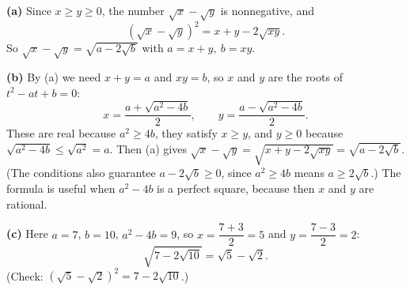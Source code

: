 \textbf{(a)} Since $x\ge y\ge0$, the number $\sqrt x-\sqrt y$ is nonnegative, and
\[\left(\sqrt x-\sqrt y\right)^2=x+y-2\sqrt{xy}.\]
So $\sqrt x-\sqrt y=\sqrt{a-2\sqrt b}$ with $\boxed{a=x+y,\ b=xy}$.

\textbf{(b)} By (a) we need $x+y=a$ and $xy=b$, so $x$ and $y$ are the roots of $t^2-at+b=0$:
\[\boxed{x=\dfrac{a+\sqrt{a^2-4b}}{2},\qquad y=\dfrac{a-\sqrt{a^2-4b}}{2}}.\]
These are real because $a^2\ge4b$, they satisfy $x\ge y$, and $y\ge0$ because $\sqrt{a^2-4b}\le\sqrt{a^2}=a$. Then (a) gives $\sqrt x-\sqrt y=\sqrt{x+y-2\sqrt{xy}}=\sqrt{a-2\sqrt b}$. (The conditions also guarantee $a-2\sqrt b\ge0$, since $a^2\ge4b$ means $a\ge2\sqrt b$.) The formula is useful when $a^2-4b$ is a perfect square, because then $x$ and $y$ are rational.

\textbf{(c)} Here $a=7$, $b=10$, $a^2-4b=9$, so $x=\dfrac{7+3}{2}=5$ and $y=\dfrac{7-3}{2}=2$:
\[\sqrt{7-2\sqrt{10}}=\boxed{\sqrt5-\sqrt2}.\]
(Check: $\left(\sqrt5-\sqrt2\right)^2=7-2\sqrt{10}$.)
